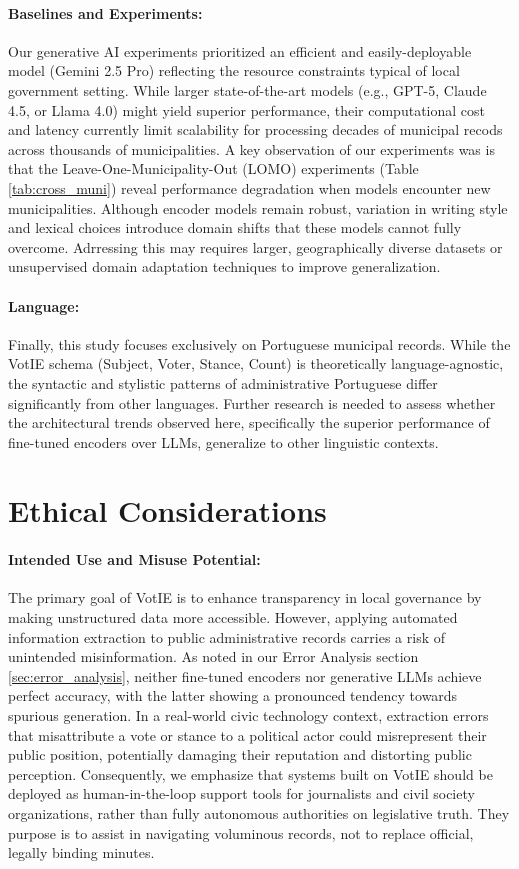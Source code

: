 \documentclass[11pt]{article}
\begin{document}
\paragraph{Baselines and Experiments:} Our generative AI experiments prioritized an efficient and easily-deployable model (Gemini 2.5 Pro) reflecting the resource constraints typical of local government setting. While larger state-of-the-art models (e.g., GPT-5, Claude 4.5, or Llama 4.0) might yield superior performance, their computational cost and latency currently limit scalability for processing decades of municipal recods across thousands of municipalities. A key observation of our experiments was is that the Leave-One-Municipality-Out (LOMO) experiments (Table \ref{tab:cross_muni}) reveal performance degradation when models encounter new municipalities. Although encoder models remain robust, variation in writing style and lexical choices introduce domain shifts that these models cannot fully overcome. Adrressing this may requires larger, geographically diverse datasets or unsupervised domain adaptation techniques to improve generalization.

\paragraph{Language:} Finally, this study focuses exclusively on Portuguese municipal records. While the VotIE schema (Subject, Voter, Stance, Count) is theoretically language-agnostic, the syntactic and stylistic patterns of administrative Portuguese differ significantly from other languages. Further research is needed to assess whether the architectural trends observed here, specifically the superior performance of fine-tuned encoders over LLMs, generalize to other linguistic contexts.

\section{Ethical Considerations}
\label{sec:ethical}

\paragraph{Intended Use and Misuse Potential:} The primary goal of VotIE is to enhance transparency in local governance by making unstructured data more accessible. However, applying automated information extraction to public administrative records carries a risk of unintended misinformation. As noted in our Error Analysis section \ref{sec:error_analysis}, neither fine-tuned encoders nor generative LLMs achieve perfect accuracy, with the latter showing a pronounced tendency towards spurious generation. In a real-world civic technology context, extraction errors that misattribute a vote or stance to a political actor could misrepresent their public position, potentially damaging their reputation and distorting public perception. Consequently, we emphasize that systems built on VotIE should be deployed as human-in-the-loop support tools for journalists and civil society organizations, rather than fully autonomous authorities on legislative truth. They purpose is to assist in navigating voluminous records, not to replace official, legally binding minutes.
\end{document}

